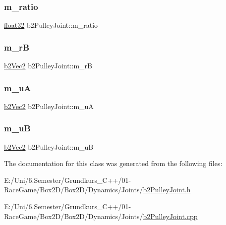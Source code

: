 \mbox{\label{classb2_pulley_joint_aa44594b9b4826c565da387bed5f02470}} 
\subsubsection{\texorpdfstring{m\_ratio}{m\_ratio}}
{\footnotesize\ttfamily \mbox{\hyperlink{b2_settings_8h_aacdc525d6f7bddb3ae95d5c311bd06a1}{float32}} b2\+Pulley\+Joint\+::m\+\_\+ratio\hspace{0.3cm}{\ttfamily [protected]}}

\mbox{\label{classb2_pulley_joint_a6be5e9ad2eeaee5cf25e1df61d923a58}} 
\subsubsection{\texorpdfstring{m\_rB}{m\_rB}}
{\footnotesize\ttfamily \mbox{\hyperlink{structb2_vec2}{b2\+Vec2}} b2\+Pulley\+Joint\+::m\+\_\+rB\hspace{0.3cm}{\ttfamily [protected]}}

\mbox{\label{classb2_pulley_joint_a8b49167603509d296aa8d04e46b13658}} 
\subsubsection{\texorpdfstring{m\_uA}{m\_uA}}
{\footnotesize\ttfamily \mbox{\hyperlink{structb2_vec2}{b2\+Vec2}} b2\+Pulley\+Joint\+::m\+\_\+uA\hspace{0.3cm}{\ttfamily [protected]}}

\mbox{\label{classb2_pulley_joint_a1354dfebc4658560b9d7e4b447b1dd5e}} 
\subsubsection{\texorpdfstring{m\_uB}{m\_uB}}
{\footnotesize\ttfamily \mbox{\hyperlink{structb2_vec2}{b2\+Vec2}} b2\+Pulley\+Joint\+::m\+\_\+uB\hspace{0.3cm}{\ttfamily [protected]}}



The documentation for this class was generated from the following files\+:\begin{DoxyCompactItemize}
\item 
E\+:/\+Uni/6.\+Semester/\+Grundkurs\+\_\+\+C++/01-\/\+Race\+Game/\+Box2\+D/\+Box2\+D/\+Dynamics/\+Joints/\mbox{\hyperlink{b2_pulley_joint_8h}{b2\+Pulley\+Joint.\+h}}\item 
E\+:/\+Uni/6.\+Semester/\+Grundkurs\+\_\+\+C++/01-\/\+Race\+Game/\+Box2\+D/\+Box2\+D/\+Dynamics/\+Joints/\mbox{\hyperlink{b2_pulley_joint_8cpp}{b2\+Pulley\+Joint.\+cpp}}\end{DoxyCompactItemize}
